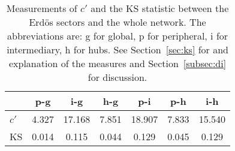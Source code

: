 \begin{table}[h!]
\begin{center}
\begin{tabular}{| l | c | c | c | c | c | c |}\hline
 & p-g & i-g & h-g & p-i & p-h & i-h \\\hline
$c'$ & 4.327  & 17.168  & 7.851  & 18.907  & 7.833  & 15.540 \\\hline
KS & 0.014  & 0.115  & 0.044  & 0.129  & 0.045  & 0.129 \\\hline
\end{tabular}
\caption{Measurements of $c'$ and the KS statistic between the Erd\"os sectors and the whole network. The abbreviations are: g for global, p for peripheral, i for intermediary, h for hubs. See Section~\ref{sec:ks} for and explanation of the measures and Section~\ref{subsec:di} for discussion.}
\end{center}
\end{table}